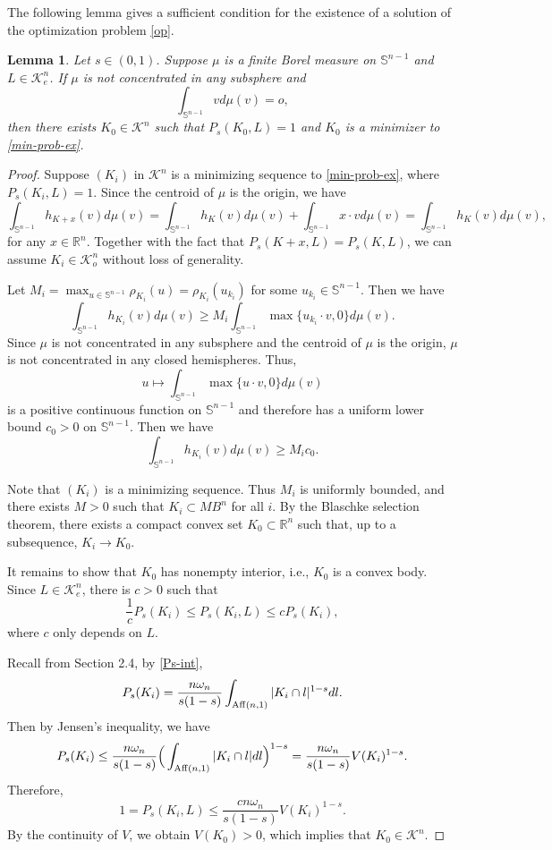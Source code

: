 \documentclass[12pt, oneside,reqno]{amsart}
\numberwithin{equation}{section}
\newtheorem{lemma}[theorem]{Lemma}
\newtheorem{definition and theorem}[theorem]{Definition and Theorem}
\theoremstyle{plain}
\theoremstyle{remark}
\theoremstyle{definition}
\newcommand{\sn}{{\mathbb S}^{n-1}}
\newcommand{\rn}{\mathbb R^n}
\newcommand{\tk}{\mathcal{K}}
\begin{document}
The following lemma gives a sufficient condition for the existence of a solution of the optimization problem \eqref{op}.

\begin{lemma}\label{sol of op}
Let $s\in(0,1)$. Suppose $\mu$ is a finite Borel measure on $\sn$ and $L\in\tk_e^n$. If $\mu$ is not concentrated in any subsphere and
\[\int_{\sn}vd\mu(v)=o,\]
then there exists $K_0\in\tk^n$ such that $P_s(K_0,L)=1$ and $K_0$ is a minimizer to \eqref{min-prob-ex}.
\end{lemma}

\begin{proof}
    Suppose $(K_i)$ in $\tk^n$ is a minimizing sequence to \eqref{min-prob-ex}, where $P_s(K_i,L)=1$. Since the centroid of $\mu$ is the origin, we have 
    \[\int_{\sn}h_{K+x}(v)d\mu(v)=\int_{\sn}h_K(v)d\mu(v)+\int_{\sn} x\cdot v d\mu(v)=\int_{\sn}h_{K}(v)d\mu(v),\]
    for any $x\in\rn$. Together with the fact that $P_s(K+x,L)=P_s(K,L)$, we can assume $K_i\in\tk_o^n$ without loss of generality.

     Let $M_i=\max_{u\in\sn}\rho_{K_i}(u)=\rho_{K_i}(u_{k_i})$ for some $u_{k_i}\in\sn$. Then we have
    \[\int_{\sn}h_{K_i}(v)d\mu(v)\ge M_i\int_{\sn} \max\{ u_{k_i}\cdot v, 0\}d\mu(v). \]
    Since $\mu$ is not concentrated in any subsphere and the centroid of $\mu$ is the origin, $\mu$ is not concentrated in any closed hemispheres. Thus,
    \[u\mapsto \int_{\sn}\max\{ u\cdot v, 0\}d\mu(v)\]
    is a positive continuous function on $\sn$ and therefore has a uniform lower bound $c_0>0$ on $\sn$. Then we have
    \[\int_{\sn}h_{K_i}(v)d\mu(v)\ge M_i c_0.\]


    Note that $(K_i)$ is a minimizing sequence. Thus $M_i$ is uniformly bounded, and there exists $M > 0$ such that $K_i \subset MB^n$ for all $i$. By the Blaschke selection theorem, there exists a compact convex set $K_0 \subset \mathbb{R}^n$ such that, up to a subsequence, $K_i \to K_0$.

    It remains to show that $K_0$ has nonempty interior, i.e., $K_0$ is a convex body. Since $L\in\tk_e^n$, there is $c>0$ such that
    \[\frac{1}{c}P_s(K_i)\leq P_s(K_i,L)\leq cP_s(K_i),\]
    where $c$ only depends on $L$. 

    Recall from Section 2.4, by \eqref{Ps-int},
        \[P_s(K_i)=\frac{n\omega_n}{s(1-s)}\int_{{\rm Aff} (n,1)}|K_i\cap l|^{1-s}dl.\]
    Then by Jensen's inequality, we have
    \[P_s(K_i)\leq \frac{n\omega_n}{s(1-s)}\Big(\int_{{\rm Aff}(n,1)}|K_i\cap l|dl\Big)^{1-s}=\frac{n\omega_n}{s(1-s)}V(K_i)^{1-s}.\]
    Therefore,
    \[1=P_s(K_i,L)\leq \frac{cn\omega_n}{s(1-s)}V(K_i)^{1-s}.\]
    By the continuity of $V$, we obtain $V(K_0)>0$, which implies that $K_0\in \tk^n$.
\end{proof}
\end{document}
